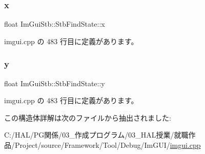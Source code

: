\subsubsection{\texorpdfstring{x}{x}}
{\footnotesize\ttfamily float Im\+Gui\+Stb\+::\+Stb\+Find\+State\+::x}



 imgui.\+cpp の 483 行目に定義があります。

\mbox{\label{struct_im_gui_stb_1_1_stb_find_state_a16d674ba203b37cecd265f02bc679449}} 
\subsubsection{\texorpdfstring{y}{y}}
{\footnotesize\ttfamily float Im\+Gui\+Stb\+::\+Stb\+Find\+State\+::y}



 imgui.\+cpp の 483 行目に定義があります。



この構造体詳解は次のファイルから抽出されました\+:\begin{DoxyCompactItemize}
\item 
C\+:/\+H\+A\+L/\+P\+G関係/03\+\_\+作成プログラム/03\+\_\+\+H\+A\+L授業/就職作品/\+Project/source/\+Framework/\+Tool/\+Debug/\+Im\+G\+U\+I/\mbox{\hyperlink{imgui_8cpp}{imgui.\+cpp}}\end{DoxyCompactItemize}

